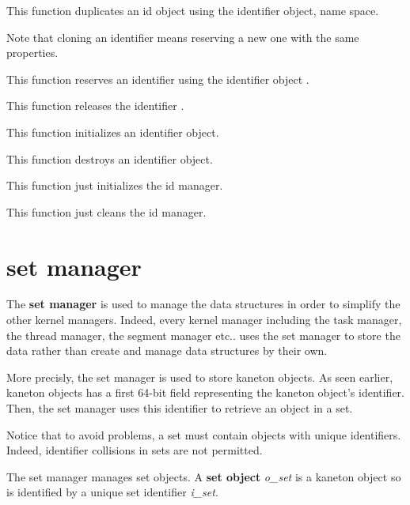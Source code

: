 	 {
	   This function duplicates an id object using the 
	   identifier object, name space.

	   Note that cloning an identifier means reserving a new one
	   with the same properties.
	 }

	  {
	    This function reserves an identifier  using the
	    identifier object .
	  }

	 {
	   This function releases the identifier .
	 }

	 {
	   This function initializes an identifier object.
	 }

	 {
	   This function destroys an identifier object.
	 }

	 {
	   This function just initializes the id manager.
	 }

	 {
	   This function just cleans the id manager.
	 }

%
%

\section{set manager}

The \textbf{set manager} is used to manage the data structures in order
to simplify the other kernel managers. Indeed, every kernel manager
including the task manager, the thread manager, the segment manager etc..
uses the set manager to store the data rather than create and manage data
structures by their own.

More precisly, the set manager is used to store kaneton objects.
As seen earlier, kaneton objects has a first 64-bit field representing
the kaneton object's identifier. Then, the set manager uses this identifier
to retrieve an object in a set.

Notice that to avoid problems, a set must contain objects with unique
identifiers. Indeed, identifier collisions in sets are not permitted.

The set manager manages set objects. A \textbf{set object} \textit{o\_set}
is a kaneton object so is identified by a unique set identifier
\textit{i\_set}.

